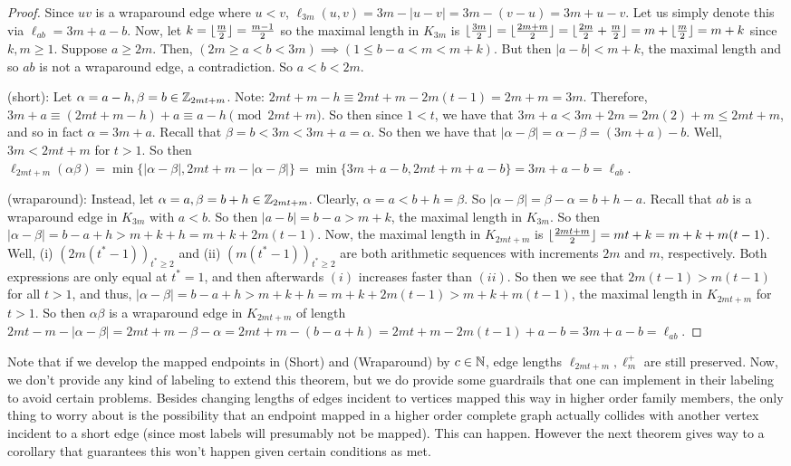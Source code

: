 \begin{proof}
Since $uv$ is a wraparound edge where $u<v$, $\ell_{3m}(u,v)=3m-|u-v|=3m-(v-u)=3m+u-v$. Let us simply denote this via $\ell_{ab}=3m+a-b$. Now, let $k=\lfloor\frac{m}{2}\rfloor=\frac{m-1}{2}$ so the maximal length in $K_{3m}$ is $\lfloor\frac{3m}{2}\rfloor=\lfloor\frac{2m+m}{2}\rfloor=\lfloor\frac{2m}{2}+\frac{m}{2}\rfloor=m+\lfloor\frac{m}{2}\rfloor=m+k$ since $k,m\geq 1$. Suppose $a\geq 2m$. Then, $(2m\geq a<b<3m)\implies (1\leq b-a<m<m+k).$ But then $|a-b|<m+k$, the maximal length and so $ab$ is not a wraparound edge, a contradiction. So $a<b<2m$.\newline

\noindent (short): Let $\alpha= a-h,\beta=b\in \mathbb{Z}_{2mt+m}$. Note: $2mt+m-h\equiv 2mt+m-2m(t-1)=2m+m=3m$. Therefore, $3m+a\equiv (2mt+m-h)+a\equiv a-h \pmod{2mt+m}$. So then since $1<t$, we have that $3m+a<3m+2m=2m(2)+m\leq 2mt+m$, and so in fact $\alpha = 3m+a$. Recall that $\beta=b<3m<3m+a=\alpha$. So then we have that $|\alpha-\beta|=\alpha-\beta=(3m+a)-b$. Well, $3m<2mt+m$ for $t>1$. So then $\ell_{2mt+m}(\alpha\beta)=\min\{|\alpha-\beta|,2mt+m-|\alpha-\beta|\}=\min\{3m+a-b, 2mt+m+a-b\}=3m+a-b=\ell_{ab}$.\newline

\noindent (wraparound): Instead, let $\alpha =a,\beta=b+h\in \mathbb{Z}_{2mt+m}$. Clearly, $\alpha=a<b+h=\beta$. So $|\alpha-\beta|=\beta-\alpha=b+h-a$. Recall that $ab$ is a wraparound edge in $K_{3m}$ with $a<b$. So then $|a-b|=b-a>m+k$, the maximal length in $K_{3m}$. So then $|\alpha-\beta|=b-a+h>m+k+h=m+k+2m(t-1)$. Now, the maximal length in $K_{2mt+m}$ is $\lfloor\frac{2mt+m}{2}\rfloor=mt+k=m+k+m(t-1)$. Well, (i) $(2m(t^{*}-1))_{t^{*}\geq 2}$ and (ii) $(m(t^{*}-1))_{t^{*}\geq 2}$ are both arithmetic sequences with increments $2m$ and $m$, respectively. Both expressions are only equal at $t^{*}=1$, and then afterwards $(i)$ increases faster than $(ii)$. So then we see that $2m(t-1)>m(t-1)$ for all $t>1$, and thus, $|\alpha-\beta|=b-a+h>m+k+h=m+k+2m(t-1)>m+k+m(t-1)$, the maximal length in $K_{2mt+m}$ for $t>1$. So then $\alpha\beta$ is a wraparound edge in $K_{2mt+m}$ of length $2mt-m-|\alpha-\beta|=2mt+m-\beta-\alpha=2mt+m - (b-a+h)= 2mt+m-2m(t-1)+a-b=3m+a-b=\ell_{ab}$.

\end{proof}
Note that if we develop the mapped endpoints in (Short) and (Wraparound) by $c\in \mathbb{N}$, edge lengths $\ell_{2mt+m},\ell_{m}^{+}$ are still preserved. Now, we don't provide any kind of labeling to extend this theorem, but we do provide some guardrails that one can implement in their labeling to avoid certain problems. Besides changing lengths of edges incident to vertices mapped this way in higher order family members, the only thing to worry about is the possibility that an endpoint mapped in a higher order complete graph actually collides with another vertex incident to a short edge (since most labels will presumably not be mapped). This can happen. However the next theorem gives way to a corollary that guarantees this won't happen given certain conditions as met.\newline
